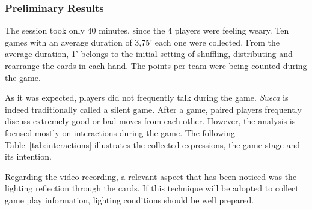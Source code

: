 \subsubsection{Preliminary Results}
The session took only 40 minutes, since the 4 players were feeling weary.
Ten games with an average duration of 3,75' each one were collected.
From the average duration, 1' belongs to the initial setting of shuffling, distributing and rearrange the cards in each hand.
The points per team were being counted during the game.

As it was expected, players did not frequently talk during the game.
\emph{Sueca} is indeed traditionally called a silent game.
After a game, paired players frequently discuss extremely good or bad moves from each other.
However, the analysis is focused mostly on interactions during the game.
The following Table~\ref{tab:interactions} illustrates the collected expressions, the game stage and its intention.


\begin{table}[h]
\caption{Examples of expressions collected during the card game activity and its respective classification.}
\label{tab:interactions}
\end{table}


Regarding the video recording, a relevant aspect that has been noticed was the lighting reflection through the cards.
If this technique will be adopted to collect game play information, lighting conditions should be well prepared.









